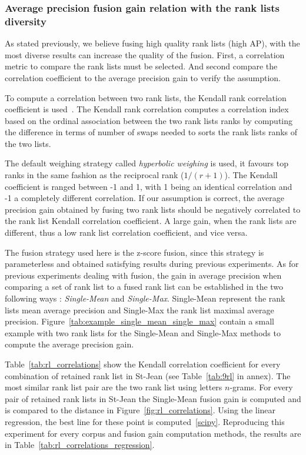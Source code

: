 \subsubsection{Average precision fusion gain relation with the rank lists diversity}

As stated previously, we believe fusing high quality rank lists (high AP), with the most diverse results can increase the quality of the fusion.
First, a correlation metric to compare the rank lists must be selected.
And second compare the correlation coefficient to the average precision gain to verify the assumption.

To compute a correlation between two rank lists, the Kendall rank correlation coefficient is used~\cite{scipy}.
The Kendall rank correlation computes a correlation index based on the ordinal association between the two rank lists ranks by computing the difference in terms of number of swaps needed to sorts the rank lists ranks of the two lists.

The default weighing strategy called \textit{hyperbolic weighing} is used, it favours top ranks in the same fashion as the reciprocal rank ($1 / (r + 1)$).
The Kendall coefficient is ranged between -1 and 1, with 1 being an identical correlation and -1 a completely different correlation.
If our assumption is correct, the average precision gain obtained by fusing two rank lists should be negatively correlated to the rank list Kendall correlation coefficient.
A large gain, when the rank lists are different, thus a low rank list correlation coefficient, and vice versa.

The fusion strategy used here is the z-score fusion, since this strategy is parameterless and obtained satisfying results during previous experiments.
As for previous experiments dealing with fusion, the gain in average precision when comparing a set of rank list to a fused rank list can be established in the two following ways : \textit{Single-Mean} and \textit{Single-Max}.
Single-Mean represent the rank lists mean average precision and Single-Max the rank list maximal average precision.
Figure~\ref{tab:example_single_mean_single_max} contain a small example with two rank lists for the Single-Mean and Single-Max methods to compute the average precision gain.

Table~\ref{tab:rl_correlations} show the Kendall correlation coefficient for every combination of retained rank list in St-Jean (see Table~\ref{tab:9rl} in annex).
The most similar rank list pair are the two rank list using letters $n$-grams.
For every pair of retained rank lists in St-Jean the Single-Mean fusion gain is computed and is compared to the distance in Figure~\ref{fig:rl_correlations}.
Using the linear regression, the best line for these point is computed~\ref{scipy}.
Reproducing this experiment for every corpus and fusion gain computation methods, the results are in Table~\ref{tab:rl_correlations_regression}.

